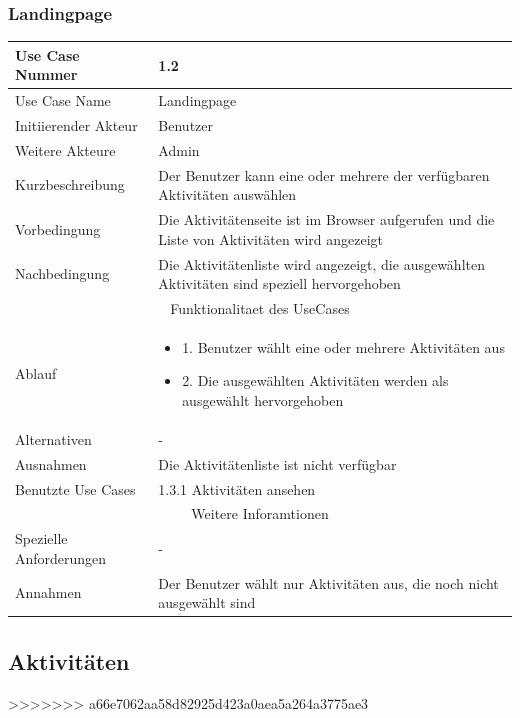 \documentclass[10pt,a4paper]{article}
\begin{document}
	\subsubsection{Landingpage}
	\begin{tabular}{|l|p{.5\linewidth}|}
	\hline Use Case Nummer & 1.2 \\ 
	\hline Use Case Name & Landingpage \\ 
	\hline Initiierender Akteur & Benutzer \\
	\hline Weitere Akteure & Admin \\
	\hline Kurzbeschreibung & Der Benutzer kann eine oder mehrere der verf\"ugbaren Aktivit\"aten ausw\"ahlen \\
	\hline Vorbedingung & Die Aktivit\"atenseite ist im Browser aufgerufen und die Liste von Aktivit\"aten wird angezeigt \\
	\hline Nachbedingung & Die Aktivit\"atenliste wird angezeigt, die ausgew\"ahlten Aktivit\"aten sind speziell hervorgehoben \\
	\hline \multicolumn{2}{|c|}{Funktionalitaet des UseCases}\\
	\hline Ablauf & \begin{itemize}
			\item 1. Benutzer w\"ahlt eine oder mehrere Aktivit\"aten aus
			\item 2. Die ausgew\"ahlten Aktivit\"aten werden als ausgew\"ahlt hervorgehoben
		\end{itemize} \\
	\hline Alternativen & - \\
	\hline Ausnahmen & Die Aktivit\"atenliste ist nicht verf\"ugbar \\
	\hline Benutzte Use Cases & 1.3.1 Aktivit\"aten ansehen \\
	\hline \multicolumn{2}{|c|}{Weitere Inforamtionen} \\
	\hline Spezielle Anforderungen & - \\
	\hline Annahmen & Der Benutzer w\"ahlt nur Aktivit\"aten aus, die noch nicht ausgew\"ahlt sind \\
	\hline
	\end{tabular}
\subsection{Aktivit\"aten}
>>>>>>> a66e7062aa58d82925d423a0aea5a264a3775ae3
\end{document}
